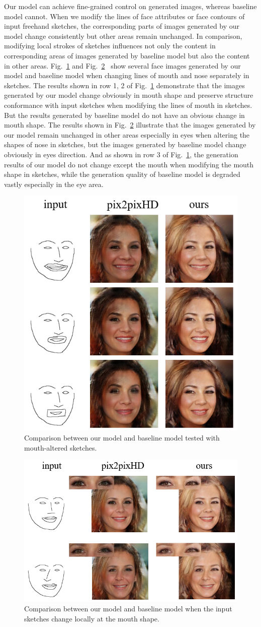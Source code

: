 \documentclass[10pt,twocolumn,letterpaper]{article}
\begin{document}
Our model can achieve fine-grained control on generated images, whereas baseline model cannot. 
When we modify the lines of face attributes or face contours of input freehand sketches, the corresponding parts of images generated by our model change consistently but other areas remain unchanged. 
In comparison, modifying local strokes of sketches influences not only the content in corresponding areas of images generated by baseline model but also the content in other areas. 
Fig.~\ref{fig:compare_2} and Fig.~\ref{fig:compare_3}~ show several face images generated by our model and baseline model when changing lines of mouth and nose separately in sketches.
The results shown in row 1, 2 of Fig.~\ref{fig:compare_2} demonstrate that the images generated by our model change obviously in mouth shape and preserve structure conformance with input sketches when modifying the lines of mouth in sketches. 
But the results generated by baseline model do not have an obvious change in mouth shape.
The results shown in Fig.~\ref{fig:compare_3} illustrate that the images generated by our model remain unchanged in other areas especially in eyes when altering the shapes of nose in sketches, but the images generated by baseline model change obviously in eyes direction. 
And as shown in row 3 of Fig.~\ref{fig:compare_2}, the generation results of our model do not change except the mouth when modifying the mouth shape in sketches, while the generation quality of baseline model is degraded vastly especially in the eye area. 
\begin{figure}[htb]
	\centering
	\includegraphics[width=0.4 \textwidth]{mouth_editing.png}
	\caption{Comparison between our model and baseline model tested with mouth-altered sketches. }
	\label{fig:compare_2}
\end{figure}

\begin{figure}[htb]
	\centering
	\includegraphics[width=0.45 \textwidth]{nose_editing.png}
	\caption{Comparison between our model and baseline model when the input sketches change locally at the mouth shape.}
	\label{fig:compare_3}
\end{figure}
\end{document}
